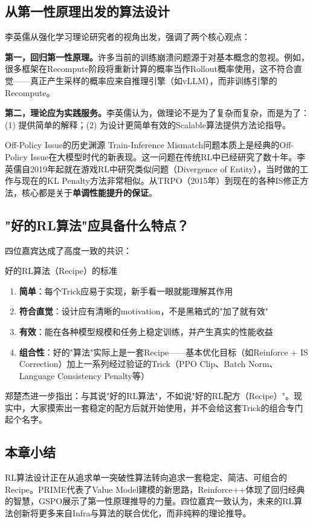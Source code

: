 \subsection{从第一性原理出发的算法设计}

李英儒从强化学习理论研究者的视角出发，强调了两个核心观点：

\textbf{第一，回归第一性原理。}许多当前的训练崩溃问题源于对基本概念的忽视。例如，很多框架在Recompute阶段将重新计算的概率当作Rollout概率使用，这不符合直觉——真正产生采样的概率应来自推理引擎（如vLLM），而非训练引擎的Recompute。

\textbf{第二，理论应为实践服务。}李英儒认为，做理论不是为了复杂而复杂，而是为了：(1) 提供简单的解释；(2) 为设计更简单有效的Scalable算法提供方法论指导。

\begin{knowledgebox}{Off-Policy Issue的历史渊源}
Train-Inference Mismatch问题本质上是经典的Off-Policy Issue在大模型时代的新表现。这一问题在传统RL中已经研究了数十年。李英儒自2019年起就在游戏RL中研究类似问题（Divergence of Entity），当时做的工作与现在的KL Penalty方法非常相似。从TRPO（2015年）到现在的各种IS修正方法，核心都是关于\textbf{单调性能提升的保证}。
\end{knowledgebox}

\subsection{"好的RL算法"应具备什么特点？}

四位嘉宾达成了高度一致的共识：

\begin{importantbox}{好的RL算法（Recipe）的标准}
\begin{enumerate}
    \item \textbf{简单}：每个Trick应易于实现，新手看一眼就能理解其作用
    \item \textbf{符合直觉}：设计应有清晰的motivation，不是黑箱式的"加了就有效"
    \item \textbf{有效}：能在各种模型规模和任务上稳定训练，并产生真实的性能收益
    \item \textbf{组合性}：好的"算法"实际上是一套Recipe——基本优化目标（如Reinforce + IS Correction）加上一系列经过验证的Trick（PPO Clip、Batch Norm、Language Consistency Penalty等）
\end{enumerate}
\end{importantbox}

郑楚杰进一步指出：与其说"好的RL算法"，不如说"好的RL配方（Recipe）"。现实中，大家摸索出一套稳定的配方后就开始使用，并不会给这套Trick的组合专门起个名字。

\subsection{本章小结}

RL算法设计正在从追求单一突破性算法转向追求一套稳定、简洁、可组合的Recipe。PRIME代表了Value Model建模的新思路，Reinforce++体现了回归经典的智慧，GSPO展示了第一性原理推导的力量。四位嘉宾一致认为，未来的RL算法创新将更多来自Infra与算法的联合优化，而非纯粹的理论推导。


